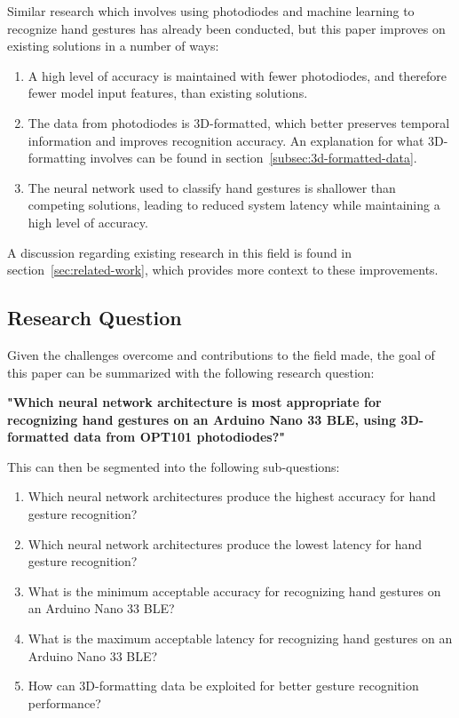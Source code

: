 Similar research which involves using photodiodes and machine learning to recognize hand gestures has already been conducted, but this paper improves on existing solutions in a number of ways:
\begin{enumerate}
    \item A high level of accuracy is maintained with fewer photodiodes, and therefore fewer model input features, than existing solutions.
    \item The data from photodiodes is 3D-formatted, which better preserves temporal information and improves recognition accuracy.
    An explanation for what 3D-formatting involves can be found in section~\ref{subsec:3d-formatted-data}.
    \item The neural network used to classify hand gestures is shallower than competing solutions, leading to reduced system latency while maintaining a high level of accuracy.
\end{enumerate}

A discussion regarding existing research in this field is found in section~\ref{sec:related-work}, which provides more context to these improvements.

\subsection{Research Question}\label{subsec:research-question}
Given the challenges overcome and contributions to the field made, the goal of this paper can be summarized with the following research question:

\textbf{"Which neural network architecture is most appropriate for recognizing hand gestures on an Arduino Nano 33 BLE, using 3D-formatted data from OPT101 photodiodes?"}

This can then be segmented into the following sub-questions:
\begin{enumerate}
    \item Which neural network architectures produce the highest accuracy for hand gesture recognition?
    \item Which neural network architectures produce the lowest latency for hand gesture recognition?
    \item What is the minimum acceptable accuracy for recognizing hand gestures on an Arduino Nano 33 BLE?
    \item What is the maximum acceptable latency for recognizing hand gestures on an Arduino Nano 33 BLE?
    \item How can 3D-formatting data be exploited for better gesture recognition performance?
\end{enumerate}

